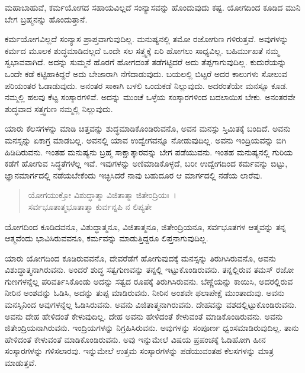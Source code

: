 {\small ಮಹಾಬಾಹುವೆ, ಕರ್ಮಯೋಗದ ಸಹಾಯವಿಲ್ಲದೆ ಸಂನ್ಯಾಸವನ್ನು ಹೊಂದುವುದು ಕಷ್ಟ. ಯೋಗದಿಂದ ಕೂಡಿದ ಮುನಿ ಬೇಗ ಬ್ರಹ್ಮನನ್ನು ಹೊಂದುತ್ತಾನೆ.}

ಕರ್ಮಯೋಗವಿಲ್ಲದೆ ಸಂನ್ಯಾಸ ಪ್ರಾಪ್ತವಾಗುವುದಿಲ್ಲ. ಮನುಷ್ಯನಲ್ಲಿ ತಮೋ ರಜೋಗುಣ ಗಳಿರುತ್ತವೆ. ಅವುಗಳನ್ನು ಕರ್ಮದ ಮೂಲಕ ಶುದ್ಧಮಾಡಿದಲ್ಲದೆ ಒಂದೇ ಸಲ ಸತ್ತ್ವಕ್ಕೆ ಏರಿ ಹೋಗಲು ಸಾಧ್ಯವಿಲ್ಲ. ಬಹಿರ್ಮುಖತೆ ನಮ್ಮ ಸ್ವಭಾವವಾಗಿದೆ. ಅದನ್ನು ಸುಮ್ಮನೆ ಹೊರಗೆ ಹೋಗದಂತೆ ತಡೆಗಟ್ಟಿದರೆ ಅದು ತೆಪ್ಪಗಾಗುವುದಿಲ್ಲ. ಕುದುರೆಯನ್ನು ಒಂದೇ ಕಡೆ ಕಟ್ಟಿಹಾಕಿದ್ದರೆ ಅದು ಬೇಜಾರಾಗಿ ನೆಗೆದಾಡುವುದು. ಬಯಲಲ್ಲಿ ಬಿಟ್ಟರೆ ಅದರ ಕಾಲುಗಳು ಸೋಲುವ ಪರಿಯಂತರ ಓಡಾಡುವುದು. ಅನಂತರ ಸಾಕಾಗಿ ಬಳಲಿ ಒಂದುಕಡೆ ನಿಲ್ಲುವುದು. ಅದರಂತೆಯೇ ಮನಸ್ಸೂ ಕೂಡ. ನಮ್ಮಲ್ಲಿ ಹಲವು ಕೆಟ್ಟ ಸಂಸ್ಕಾರಗಳಿವೆ. ಅದನ್ನು ಮುಂಚೆ ಒಳ್ಳೆಯ ಸಂಸ್ಕಾರಗಳಿಂದ ಬದಲಾಯಿಸ ಬೇಕು. ಅನಂತರವೇ ಶುದ್ಧವಾದ ಸತ್ತ್ವಗುಣ ನಮ್ಮಲ್ಲಿ ನಿಲ್ಲುವುದು.

ಯಾರು ಕೆಲಸಗಳನ್ನು ಮಾಡಿ ಚಿತ್ತವನ್ನು ಶುದ್ಧಮಾಡಿಕೊಂಡಿರುವನೊ, ಅವನ ಮನಸ್ಸು ಸ್ತಿಮಿತಕ್ಕೆ ಬಂದಿದೆ. ಅವನು ಮನಸ್ಸನ್ನು ಏಕಾಗ್ರ ಮಾಡಬಲ್ಲ. ಅವನಲ್ಲಿ ಯಾವ ಉದ್ವೇಗವನ್ನೂ ನೋಡುವುದಿಲ್ಲ. ಅವನು ಇಂದ್ರಿಯವನ್ನು ಬಿಗಿ ಹಿಡಿದಿರುವನು. ಇಂತಹ ಮನುಷ್ಯನು ಬ್ರಹ್ಮ ಸಾಕ್ಷಾತ್ಕಾರವನ್ನು ಬೇಗ ಪಡೆಯುವನು. ಇಂತಹ ಮನುಷ್ಯನಲ್ಲಿ ಗುರಿಯ ಕಡೆಗೆ ಹೋಗುವ ಸಿದ್ಧತೆಗಳೆಲ್ಲ ಇವೆ. ಇವುಗಳನ್ನು ಅಣಿಮಾಡಿಕೊಳ್ಳದೆ, ಬರೀ ಉದ್ವೇಗದಿಂದ ಕರ್ಮವನ್ನು ಬಿಟ್ಟು, ಜ್ಞಾನಮಾರ್ಗದಲ್ಲಿ ನಡೆಯಬೇಕೆಂದು ಇಚ್ಛಿಸಿದರೆ ನಾವು ಬಹುದೂರ ಆ ಮಾರ್ಗದಲ್ಲಿ ನಡೆಯ ಲಾರೆವು.\\

\begin{verse}
ಯೋಗಯುಕ್ತೋ ವಿಶುದ್ಧಾತ್ಮಾ ವಿಜಿತಾತ್ಮಾ ಜಿತೇಂದ್ರಿಯಃ~।\\ಸರ್ವಭೂತಾತ್ಮಭೂತಾತ್ಮಾ ಕುರ್ವನ್ನಪಿ ನ ಲಿಪ್ಯತೇ 
\end{verse}

ಯೋಗದಿಂದ ಕೂಡಿದವನೂ, ವಿಶುದ್ಧಾತ್ಮನೂ, ವಿಜಿತಾತ್ಮನೂ, ಜಿತೇಂದ್ರಿಯನೂ, ಸರ್ವಭೂತಗಳ ಆತ್ಮವನ್ನು ತನ್ನ ಆತ್ಮವೆಂದು ಭಾವಿಸಿರುವವನೂ, ಕರ್ಮವನ್ನು ಮಾಡುತ್ತಿದ್ದರೂ ಲಿಪ್ತನಾಗುವುದಿಲ್ಲ.

ಯಾರು ಯೋಗದಿಂದ ಕೂಡಿರುವವನೊ, ದೇವರೆಡೆಗೆ ಹೋಗುವುದಕ್ಕೆ ಮನಸ್ಸನ್ನು ತಿರುಗಿಸಿರುವನೊ, ಅವನು ವಿಶುದ್ಧಾತ್ಮನಾಗಿರುವನು. ಅಂದರೆ ಶುದ್ಧ ಸತ್ವಗುಣವನ್ನು ತನ್ನಲ್ಲಿ ಇಟ್ಟುಕೊಂಡಿರುವನು. ತನ್ನಲ್ಲಿರುವ ತಮಸ್ ರಜೋ ಗುಣಗಳನ್ನೆಲ್ಲ ಪರಿವರ್ತಿಸಿಕೊಂಡು ಅದನ್ನು ಸತ್ವದ ರೂಪಕ್ಕೆ ತಿರುಗಿಸಿರುವನು. ಬೆಣ್ಣೆಯನ್ನು ಕಾಯಿಸಿ, ಅದರಲ್ಲಿರುವ ನೀರಿನ ಅಂಶವನ್ನು ಓಡಿಸಿ, ಅದನ್ನು ತುಪ್ಪ ಮಾಡಿರುವನು. ನೀರಿನ ಅಂಶವೇ ಫಲಾಪೇಕ್ಷೆ ಮುಂತಾದುವು. ಅವನು ಮನಸ್ಸಿನಿಂದ ಅವುಗಳನ್ನೆಲ್ಲ ಓಡಿಸಿರುವನು. ಅವನು ವಿಜಿತಾತ್ಮನಾಗಿರುವನು. ದೇಹವನ್ನು ವಶದಲ್ಲಿಟ್ಟುಕೊಂಡಿರುವನು. ಅವನು ದೇಹ ಹೇಳಿದಂತೆ ಕೇಳುವುದಿಲ್ಲ. ದೇಹ ಅವನು ಹೇಳಿದಂತೆ ಕೇಳುವಂತೆ ಮಾಡಿಕೊಂಡಿರುವನು. ಅವನು ಜಿತೇಂದ್ರಿಯನಾಗಿರುವನು. ಇಂದ್ರಿಯಗಳನ್ನು ನಿಗ್ರಹಿಸಿರುವನು. ಅವುಗಳನ್ನು ಸಂಪೂರ್ಣ ಧ್ವಂಸಮಾಡಿರುವುದಿಲ್ಲ. ತಾನು ಹೇಳಿದಂತೆ ಕೇಳುವಂತೆ ಮಾಡಿಕೊಂಡಿರುವನು. ಅವು ಇನ್ನುಮೇಲೆ ವಿಷಯ ಪ್ರಪಂಚಕ್ಕೆ ಓಡಿಹೋಗಿ ಹೀನ ಸಂಸ್ಕಾರಗಳನ್ನು ಗಳಿಸಲಾರವು. ಇನ್ನುಮೇಲೆ ಉತ್ತಮ ಸಂಸ್ಕಾರಗಳನ್ನು ಪಡೆಯುವಂತಹ ಕೆಲಸಗಳನ್ನು ಮಾತ್ರ ಮಾಡುತ್ತವೆ.

